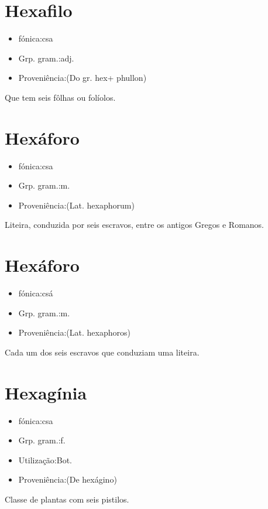 \documentclass{article}
\begin{document}
\section{Hexafilo}
\begin{itemize}
\item {fónica:csa}
\end{itemize}
\begin{itemize}
\item {Grp. gram.:adj.}
\end{itemize}
\begin{itemize}
\item {Proveniência:(Do gr. \textunderscore hex\textunderscore  + \textunderscore phullon\textunderscore )}
\end{itemize}
Que tem seis fôlhas ou folíolos.
\section{Hexáforo}
\begin{itemize}
\item {fónica:csa}
\end{itemize}
\begin{itemize}
\item {Grp. gram.:m.}
\end{itemize}
\begin{itemize}
\item {Proveniência:(Lat. \textunderscore hexaphorum\textunderscore )}
\end{itemize}
Liteira, conduzida por seis escravos, entre os antigos Gregos e Romanos.
\section{Hexáforo}
\begin{itemize}
\item {fónica:csá}
\end{itemize}
\begin{itemize}
\item {Grp. gram.:m.}
\end{itemize}
\begin{itemize}
\item {Proveniência:(Lat. \textunderscore hexaphoros\textunderscore )}
\end{itemize}
Cada um dos seis escravos que conduziam uma liteira.
\section{Hexagínia}
\begin{itemize}
\item {fónica:csa}
\end{itemize}
\begin{itemize}
\item {Grp. gram.:f.}
\end{itemize}
\begin{itemize}
\item {Utilização:Bot.}
\end{itemize}
\begin{itemize}
\item {Proveniência:(De \textunderscore hexágino\textunderscore )}
\end{itemize}
Classe de plantas com seis pistilos.
\end{document}
